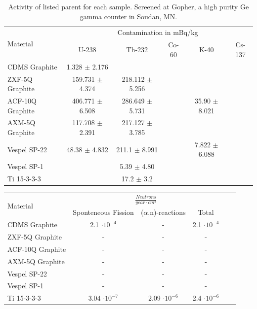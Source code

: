 \documentclass{report}
\begin{document}
\begin{multicols}{2}
\begin{table}[htb]
\centering
\begin{threeparttable}
\begin{tabular}{l|ccccc}
\multirow{2}{*}{\large{Material}} & \multicolumn{5}{c}{Contamination in mBq/kg}\\
& U-238 & Th-232 & Co-60 & K-40 & Cs-137 \\\toprule
CDMS Graphite & 1.328 $\pm$ 2.176 & & & & \\
ZXF-5Q Graphite & 159.731 $\pm$ 4.374 & 218.112 $\pm$ 5.256 &  &  &  \\
ACF-10Q Graphite & 406.771 $\pm$ 6.508 & 286.649 $\pm$ 5.731 & & 35.90 $\pm$ 8.021 &\\
AXM-5Q Graphite & 117.708 $\pm$ 2.391 & 217.127 $\pm$ 3.785 & & &  \\
Vespel SP-22 & 48.38 $\pm$ 4.832 & 211.1 $\pm$ 8.991 & & 7.822 $\pm$ 6.088 &\\
Vespel SP-1 & & 5.39 $\pm$ 4.80 & & &  \\
Ti 15-3-3-3 & & 17.2 $\pm$ 3.2 & & &  \\

\end{tabular}
\caption{Activity of listed parent for each sample. Screened at Gopher, a high purity Ge
gamma counter in Soudan, MN.}
\end{threeparttable}
\end{table}

\begin{table}[htb]
\centering
\begin{threeparttable}
\begin{tabular}{l|ccccc}
\multirow{2}{*}{\large{Material}} & \multicolumn{3}{c}{$\frac{Neutrons}{year \cdot cm^{3}}$}\\
& Sponteneous Fission & ($\alpha$,n)-reactions & Total \\\toprule
CDMS Graphite & 2.1 $\cdot 10^{-4}$ & - & 2.1 $\cdot 10^{-4}$ \\
ZXF-5Q Graphite & - & - & - \\
ACF-10Q Graphite & - & - & - \\
AXM-5Q Graphite & - & - & - \\
Vespel SP-22 & - & - & - \\
Vespel SP-1 & - & - & - \\
Ti 15-3-3-3 & 3.04 $\cdot 10^{-7}$ & 2.09 $\cdot 10^{-6}$ & 2.4 $\cdot 10^{-6}$ \\


\end{tabular}
\end{threeparttable}
\end{table}
\end{multicols}
\end{document}

